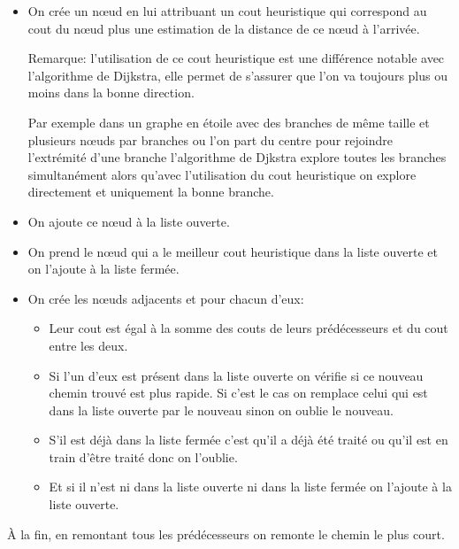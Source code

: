     \begin{itemize}
      \item On crée un nœud en lui attribuant un cout heuristique qui
        correspond au cout du nœud plus une estimation de la distance de ce
        nœud à l'arrivée.

        Remarque: l'utilisation de ce cout heuristique est une différence
        notable avec l'algorithme de Dijkstra, elle permet de s'assurer que
        l'on va toujours plus ou moins dans la bonne direction.

        Par exemple dans un graphe en étoile avec des branches de même taille
        et plusieurs nœuds par branches ou l'on part du centre pour rejoindre
        l'extrémité d'une branche l'algorithme de Djkstra explore toutes les
        branches simultanément alors qu'avec l'utilisation du cout heuristique
        on explore directement et uniquement la bonne branche.
      \item On ajoute ce nœud à la liste ouverte.
      \item On prend le nœud qui a le meilleur cout heuristique dans la liste
        ouverte et on l'ajoute à la liste fermée.
      \item On crée les nœuds adjacents et pour chacun d'eux:
        \begin{itemize}
          \item Leur cout est égal à la somme des couts de leurs prédécesseurs
            et du cout entre les deux.
          \item Si l'un d'eux est présent dans la liste ouverte on vérifie si
            ce nouveau chemin trouvé est plus rapide. Si c'est le cas on
            remplace celui qui est dans la liste ouverte par le nouveau sinon
            on oublie le nouveau.
          \item S'il est déjà dans la liste fermée c'est qu'il a déjà été
            traité ou qu'il est en train d'être traité donc on l'oublie.
          \item Et si il n'est ni dans la liste ouverte ni dans la liste fermée
            on l'ajoute à la liste ouverte.
        \end{itemize}
    \end{itemize}
	
    À la fin, en remontant tous les prédécesseurs on remonte le chemin le plus
    court.
